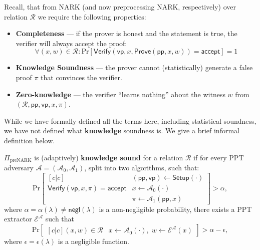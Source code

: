 \documentclass[../lecture-notes.tex]{subfiles}
\begin{document}
Recall, that from NARK (and now preprocessing NARK, respectively) over relation $\mathcal{R}$ we require the following properties:
\begin{itemize}
    \item \textbf{Completeness} --- if the prover is honest and the statement is true, the verifier will always accept the proof:
    \begin{equation*}
        \forall (x,w) \in \mathcal{R}: \text{Pr}[\mathsf{Verify}(\mathsf{vp}, x, \mathsf{Prove}(\mathsf{pp},x,w)) = \mathsf{accept}] = 1
    \end{equation*}
    \item \textbf{Knowledge Soundness} --- the prover cannot (statistically) generate a false proof $\pi$ that convinces the verifier. 
    \item \textbf{Zero-knowledge} --- the verifier ``learns nothing'' about the witness $w$ from $(\mathcal{R},\mathsf{pp},\mathsf{vp},x,\pi)$.
\end{itemize}

While we have formally defined all the terms here, including statistical soundness, we have not defined what \textbf{knowledge} soundness is. We give a brief informal definition below.

\begin{definition}
    $\Pi_{\text{preNARK}}$ is (adaptively) \textbf{knowledge sound} for a relation $\mathcal{R}$ if for every PPT adversary $\mathcal{A}=(\mathcal{A}_0,\mathcal{A}_1)$, split into two algorithms, such that:
    \begin{equation*}
        \text{Pr}\begin{bmatrix}[c|c]
            & (\mathsf{pp},\mathsf{vp}) \gets \mathsf{Setup}(\cdot)\\
            \mathsf{Verify}(\mathsf{vp},x,\pi)=\mathsf{accept} & x \gets \mathcal{A}_0(\cdot)  \\
            & \pi \gets \mathcal{A}_1(\mathsf{pp},x)
        \end{bmatrix} > \alpha,
    \end{equation*}
    where $\alpha=\alpha(\lambda) \neq \mathsf{negl}(\lambda)$ is a non-negligible probability, there exists a PPT extractor $\mathcal{E}^{\mathcal{A}}$ such that
    \begin{equation*}
        \text{Pr}\begin{bmatrix}[c|c]
            (x,w) \in \mathcal{R} & x \gets \mathcal{A}_0(\cdot), \; w \gets \mathcal{E}^{\mathcal{A}}(x)
        \end{bmatrix} > \alpha - \epsilon,
    \end{equation*}
    where $\epsilon = \epsilon(\lambda)$ is a negligible function.
\end{definition}
\end{document}
